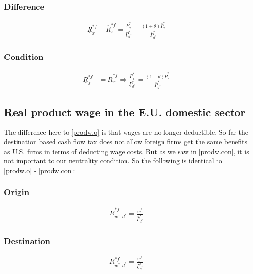 \subsubsection*{Difference}
\begin{equation}\label{xproeu.diff}
\begin{aligned}
\underline R^{*f}_x - \overline R^{*f}_x = \frac{\underline P^*_x}{\underline P^*_{d^*}} - \frac{ \left( 1+\theta \right) \overline P^*_x}{\overline P^*_{d^*}}
\end{aligned}  
\end{equation}

\subsubsection*{Condition}
\begin{equation}\label{xproeu.con} 
\begin{aligned}
    \underline R^{*f}_x &= \overline R^{*f}_x \Rightarrow \frac{\underline P^*_x}{\underline P^*_{d^*}} = \frac{ \left( 1+\theta \right) \overline P^*_x}{\overline P^*_{d^*}}
\end{aligned}  
\end{equation}

\subsection*{Real product wage in the E.U. domestic sector}
The difference here to \eqref{prodw.o} is that wages are no longer deductible. So far the destination based cash flow tax does not allow foreign firms get the same benefits as U.S. firms in terms of deducting wage costs. But as we saw in \eqref{prodw.con}, it is not important to our neutrality condition. So the following is identical to \eqref{prodw.o} - \eqref{prodw.con}:

\subsubsection*{Origin}
\begin{equation}\label{prodweu.o}
\begin{aligned}
\overline R^{*f}_{w^*, d^*} = \frac{\overline w^*}{\overline P^*_{d^*}}
\end{aligned}  
\end{equation}

\subsubsection*{Destination}
\begin{equation}\label{prodweu.d}
\begin{aligned}
\underline R^{*f}_{w^*, d^*} = \frac{\underline w^*}{\underline P^*_{d^*}}
\end{aligned}  
\end{equation}


